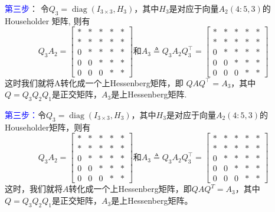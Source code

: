 \documentclass[12pt,a4paper]{article}
\begin{document}
\textcolor{blue}{第三步}：
令$Q_{3}=\operatorname{diag}\left(I_{3 \times 3}, H_{3}\right)$，其中$H_{3}$是对应于向量$A_{2}(4 : 5,3)$的Householder 矩阵, 则有
$$
Q_{3} A_{2}=\left[\begin{array}{ccccc}
* &*& *& *&* \\ 
* &*& *& *&* \\ 
0 &*& *& *&*\\ 
0 &0& *& *&*\\ 
0 &0& 0& *&*
\end{array}\right]和A_{3} \triangleq Q_{3} A_{2} Q_{3}^{\top}=\left[\begin{array}{ccccc}
* &*& *& *&* \\ 
* &*& *& *&* \\ 
0 &*& *& *&*\\ 
0 &0& *& *&*\\ 
0 &0& 0& *&*
\end{array}\right]
$$
这时我们就将A转化成一个上Hessenberg矩阵，即
$Q A Q^{\top}=A_{3}$，其中$Q=Q_{3} Q_{2} Q_{1}$是正交矩阵，$A_{3}$是上Hessenberg矩阵.

\textcolor{blue}{第三步：}\quad 令$Q_{3}=\operatorname{diag}\left(I_{3 \times 3}, H_{3}\right)$，其中$H_3$是对应于向量$A_2(4:5,3)$的Householder矩阵，则有$$
Q_{3} A_{2}=\left[\begin{array}{ccccc}{*} & {*} &{*} &{*} & {*} \\ {*} & {*} &{*} &{*} & {*} \\ {0} & {*} &{*} & {*} &{*} \\ {0} & {0} & {*} &{*} & {*} \\ {0} & {0} & {0} & {*} &{*}\end{array}\right]
\text{和} A_{3} \triangleq Q_{3} A_{2} Q_{3}^{\top}=\left[\begin{array}{ccccc}{*} & {*} &{*} &{*} & {*} \\ {*} & {*} &{*} &{*} & {*} \\ {0} & {*} &{*} &{*} & {*} \\  {0} & {0} & {*} &{*} & {*} \\ {0} & {0} & {0} &{*} & {*}\end{array}\right]
$$
这时，我们就将$A$转化成一个上Hessenberg矩阵，即$QAQ^T=A_3$，其中$Q=Q_3Q_2Q_1$是正交矩阵，$A_3$是上Hessenberg矩阵。
\end{document}

